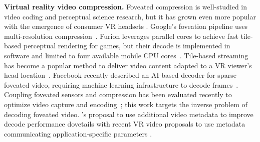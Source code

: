 \textbf{Virtual reality video compression. }Foveated compression is well-studied in video coding and perceptual science research, but it has grown even more popular with the emergence of consumer VR headsets \cite{geisler1998real, albert}.
Google's foveation pipeline uses multi-resolution compression~\cite{google-foveation}.
Furion leverages parallel cores to achieve fast tile-based perceptual rendering for games, but their decode is implemented in software and limited to four available mobile CPU cores~\cite{furion2019}.
Tile-based streaming has become a popular method to deliver video content adapted to a VR viewer's head location~\cite{liu2018mobisys}.
Facebook recently described an AI-based decoder for sparse foveated video, requiring machine learning infrastructure to decode frames~\cite{kaplanyan2019deepfovea}.
Coupling foveated sensors and compression has been evaluated recently to optimize video capture and encoding~\cite{8493507}; this work targets the inverse problem of decoding foveated video.
\nameArch's proposal to use additional video metadata to improve decode performance dovetails with recent VR video proposals to use metadata communicating application-specific parameters \cite{vignette,bhaynes_vldb18}.
